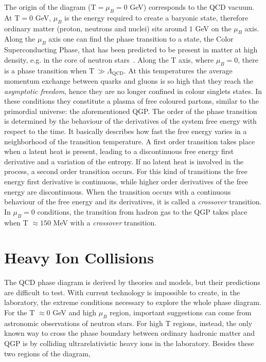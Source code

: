 The origin of the diagram (T$=\mu_{B}=0$ GeV) corresponds to the QCD vacuum. At T$=0$ GeV, $\mu_{B}$ is 
the energy required to create a baryonic state, therefore ordinary matter (proton, neutrons and nuclei)
sits around $1$ GeV on the $\mu_{B}$ axis. Along the $\mu_{B}$ axis one can find the phase transition to a state,
the Color Superconducting Phase, that has been predicted to be present in matter at high density,
e.g. in  the core of neutron stars~\cite{csp}.
Along the T axis, where $\mu_{B}=0$, there is a phase transition when T$\ \gg \Lambda_{\mathrm{QCD}}$. 
At this temperatures the average momentum exchange between quarks and gluons is so high that they reach
the \textit{asymptotic freedom}, hence they are no longer confined in colour singlets states.
In these conditions they constitute a plasma of free coloured partons, similar to the primordial 
universe: the aforementioned QGP.
The order of the phase transition is determined by the behaviour of the derivatives of the system free
energy with respect to the time. It basically describes how fast the free energy varies in a
neighborhood of the transition temperature.
A first order transition takes place when a latent heat is present, leading to a discontinuous free
energy first derivative and a variation of the entropy.
If no latent heat is involved in the process, a second order transition occurs. For this kind of
transitions the free energy first derivative is continuous, while higher order derivatives of the free
energy are discontinuous.
When the transition occurs with a continuous behaviour of the free energy and its derivatives,
it is called a \textit{crossover} transition.
In $\mu_{B}=0$ conditions, the transition from hadron gas to the QGP takes place when T
$\approx 150$ MeV with a \textit{crossover} transition.

%
%
\section{Heavy Ion Collisions}
\label{sec:1.3}

The QCD phase diagram is derived by theories and models, but their predictions are difficult to test.
With current technology is impossible to create, in the laboratory, the extreme conditions necessary
to explore the whole phase diagram.
For the T $\approx0$ GeV and high $\mu_{B}$ region, important suggestions can come from astronomic
observations of neutron stars. 
For high T regions, instead, the only known way to cross the phase boundary between ordinary hadronic
matter and QGP is by colliding ultrarelativistic heavy ions in the laboratory.
Besides these two regions of the diagram,  

